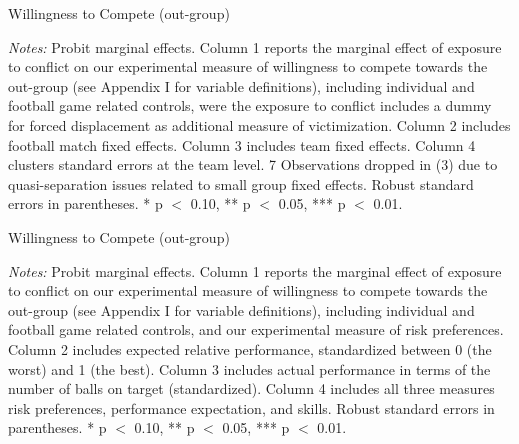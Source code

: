 \clearpage


\begin{threeparttable}[tp]
	\caption{Willingness to Compete (out-group)}
	\label{tab:slf:compete_disp}
	\centering
	\tiny
	
	\begin{tablenotes}
		\item \textit{Notes:} Probit marginal effects. Column 1 reports the marginal effect of exposure to conflict on our experimental measure of willingness to compete towards the out-group (see Appendix I for variable definitions), including individual and football game related controls, were the exposure to conflict includes a dummy for forced displacement as additional measure of victimization. Column 2 includes football match fixed effects. Column 3 includes team fixed effects. Column 4 clusters standard errors at the team level. 7 Observations dropped in (3) due to quasi-separation issues related to small group fixed effects. Robust standard errors in parentheses. * p $<$ 0.10, ** p $<$ 0.05, *** p $<$ 0.01.
		\item
	\end{tablenotes}
\end{threeparttable}

\clearpage


\begin{threeparttable}[tp]
	\caption{Willingness to Compete (out-group)}
	\label{tab:slf:compete_abl}
	\centering
	\tiny
	
	\begin{tablenotes}
		\item \textit{Notes:} Probit marginal effects. Column 1 reports the marginal effect of exposure to conflict on our experimental measure of willingness to compete towards the out-group (see Appendix I for variable definitions), including individual and football game related controls, and our experimental measure of risk preferences. Column 2 includes expected relative performance, standardized between 0 (the worst) and 1 (the best). Column 3 includes actual performance in terms of the number of balls on target (standardized). Column 4 includes all three measures risk preferences, performance expectation, and skills. Robust standard errors in parentheses.  * p $<$ 0.10, ** p $<$ 0.05, *** p $<$ 0.01.
		\item
	\end{tablenotes}
\end{threeparttable}


\clearpage 

